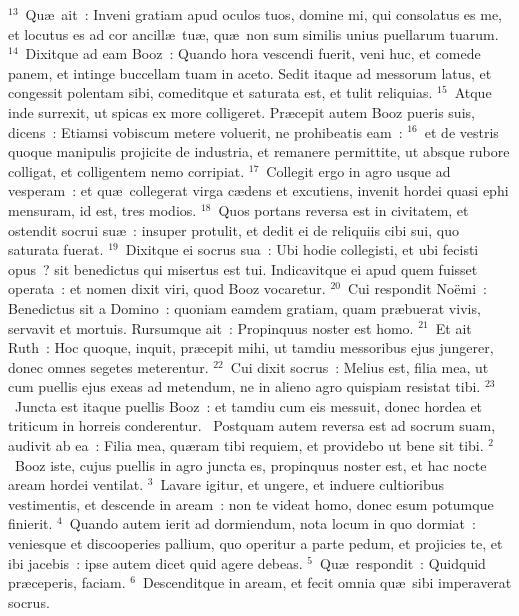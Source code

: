 ${}^{13}$~Qu\ae\ ait~: Inveni gratiam apud oculos tuos, domine mi, qui consolatus es me, et locutus es ad cor ancill\ae\ tu\ae , qu\ae\ non sum similis unius puellarum tuarum.
${}^{14}$~Dixitque ad eam Booz~: Quando hora vescendi fuerit, veni huc, et comede panem, et intinge buccellam tuam in aceto. Sedit itaque ad messorum latus, et congessit polentam sibi, comeditque et saturata est, et tulit reliquias.
${}^{15}$~Atque inde surrexit, ut spicas ex more colligeret. Pr\ae cepit autem Booz pueris suis, dicens~: Etiamsi vobiscum metere voluerit, ne prohibeatis eam~:
${}^{16}$~et de vestris quoque manipulis projicite de industria, et remanere permittite, ut absque rubore colligat, et colligentem nemo corripiat.
${}^{17}$~Collegit ergo in agro usque ad vesperam~: et qu\ae\ collegerat virga c\ae dens et excutiens, invenit hordei quasi ephi mensuram, id est, tres modios.
${}^{18}$~Quos portans reversa est in civitatem, et ostendit socrui su\ae~: insuper protulit, et dedit ei de reliquiis cibi sui, quo saturata fuerat.
${}^{19}$~Dixitque ei socrus sua~: Ubi hodie collegisti, et ubi fecisti opus~? sit benedictus qui misertus est tui. Indicavitque ei apud quem fuisset operata~: et nomen dixit viri, quod Booz vocaretur.
${}^{20}$~Cui respondit No\"emi~: Benedictus sit a Domino~: quoniam eamdem gratiam, quam pr\ae buerat vivis, servavit et mortuis. Rursumque ait~: Propinquus noster est homo.
${}^{21}$~Et ait Ruth~: Hoc quoque, inquit, pr\ae cepit mihi, ut tamdiu messoribus ejus jungerer, donec omnes segetes meterentur.
${}^{22}$~Cui dixit socrus~: Melius est, filia mea, ut cum puellis ejus exeas ad metendum, ne in alieno agro quispiam resistat tibi.
${}^{23}$~Juncta est itaque puellis Booz~: et tamdiu cum eis messuit, donec hordea et triticum in horreis conderentur.
~\lettrine[lines=10,image=true,loversize=0.05,lraise=-0.03]{P}{}ostquam autem reversa est ad socrum suam, audivit ab ea~: Filia mea, qu\ae ram tibi requiem, et providebo ut bene sit tibi.
${}^{2}$~Booz iste, cujus puellis in agro juncta es, propinquus noster est, et hac nocte aream hordei ventilat.
${}^{3}$~Lavare igitur, et ungere, et induere cultioribus vestimentis, et descende in aream~: non te videat homo, donec esum potumque finierit.
${}^{4}$~Quando autem ierit ad dormiendum, nota locum in quo dormiat~: veniesque et discooperies pallium, quo operitur a parte pedum, et projicies te, et ibi jacebis~: ipse autem dicet quid agere debeas.
${}^{5}$~Qu\ae\ respondit~: Quidquid pr\ae ceperis, faciam.
${}^{6}$~Descenditque in aream, et fecit omnia qu\ae\ sibi imperaverat socrus.


